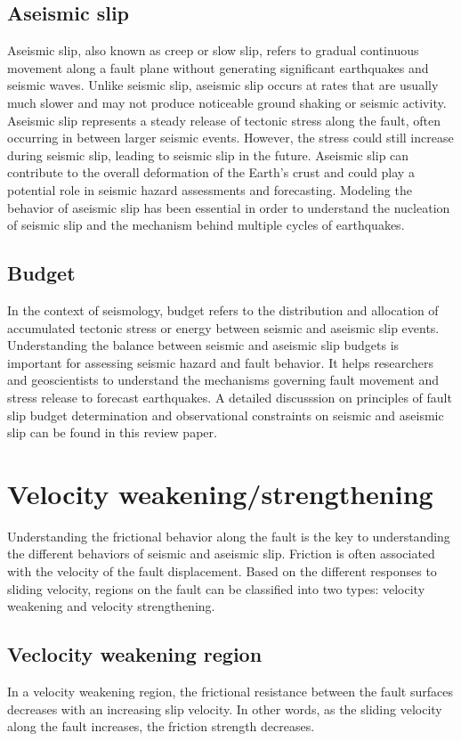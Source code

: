 \subsection{Aseismic slip}
Aseismic slip, also known as creep or slow slip, refers to gradual continuous movement along a fault plane without generating significant earthquakes and seismic waves.
Unlike seismic slip, aseismic slip occurs at rates that are usually much slower and may not produce noticeable ground shaking or seismic activity.
Aseismic slip represents a steady release of tectonic stress along the fault, often occurring in between larger seismic events.
However, the stress could still increase during seismic slip, leading to seismic slip in the future.
Aseismic slip can contribute to the overall deformation of the Earth's crust and could play a potential role in seismic hazard assessments and forecasting.
Modeling the behavior of aseismic slip has been essential in order to understand the nucleation of seismic slip and the mechanism behind multiple cycles of earthquakes.

\subsection{Budget}
In the context of seismology, budget refers to the distribution and allocation of accumulated tectonic stress or energy between seismic and aseismic slip events.
Understanding the balance between seismic and aseismic slip budgets is important for assessing seismic hazard and fault behavior.
It helps researchers and geoscientists to understand the mechanisms governing fault movement and stress release to forecast earthquakes. A detailed discusssion on principles of fault slip budget determination and observational constraints on seismic and aseismic slip can be found in this review paper\citep{annurev:/content/journals/10.1146/annurev-earth-060614-105302}.


\section{Velocity weakening/strengthening}
Understanding the frictional behavior along the fault is the key to understanding the different behaviors of seismic and aseismic slip.
Friction is often associated with the velocity of the fault displacement.
Based on the different responses to sliding velocity, regions on the fault can be classified into two types: velocity weakening and velocity strengthening.
\subsection{Veclocity weakening region}
In a velocity weakening region, the frictional resistance between the fault surfaces decreases with an increasing slip velocity.
In other words, as the sliding velocity along the fault increases, the friction strength decreases.

